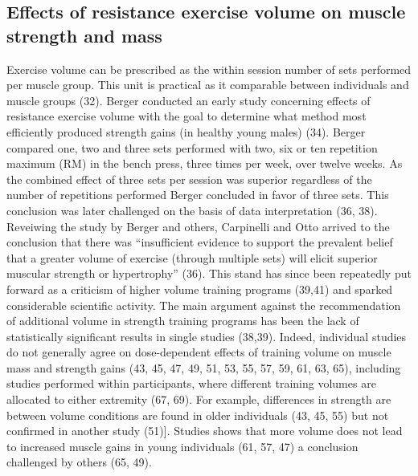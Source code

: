 \documentclass[twoside,10pt]{gihclass} %
\begin{document}
\hypertarget{effects-of-resistance-exercise-volume-on-muscle-strength-and-mass}{%
\subsection{Effects of resistance exercise volume on muscle strength and mass}\label{effects-of-resistance-exercise-volume-on-muscle-strength-and-mass}}

Exercise volume can be prescribed as the within session number of sets performed per muscle group. This unit is practical as it comparable between individuals and muscle groups (32).
Berger conducted an early study concerning effects of resistance exercise volume with the goal to determine what method most efficiently produced strength gains (in healthy young males) (34). Berger compared one, two and three sets performed with two, six or ten repetition maximum (RM) in the bench press, three times per week, over twelve weeks. As the combined effect of three sets per session was superior regardless of the number of repetitions performed Berger concluded in favor of three sets. This conclusion was later challenged on the basis of data interpretation
(36, 38).
Reveiwing the study by Berger and others, Carpinelli and Otto arrived to the conclusion that there was ``insufficient evidence to support the prevalent belief that a greater volume of exercise (through multiple sets) will elicit superior muscular strength or hypertrophy'' (36). This stand has since been repeatedly put forward as a criticism of higher volume training programs
(39,41) and sparked considerable scientific activity. The main argument against the recommendation of additional volume in strength training programs has been the lack of statistically significant results in single studies (38,39).
Indeed, individual studies do not generally agree on dose-dependent effects of training volume on muscle mass and strength gains
(43, 45, 47, 49, 51, 53, 55, 57, 59, 61, 63, 65),
including studies performed within participants, where different training volumes are allocated to either extremity
(67, 69).
For example, differences in strength are between volume conditions are found in older individuals
(43, 45, 55)
but not confirmed in another study
(51){]}.
Studies shows that more volume does not lead to increased muscle gains in young individuals
(61, 57, 47)
a conclusion challenged by others
(65, 49).
\end{document}
